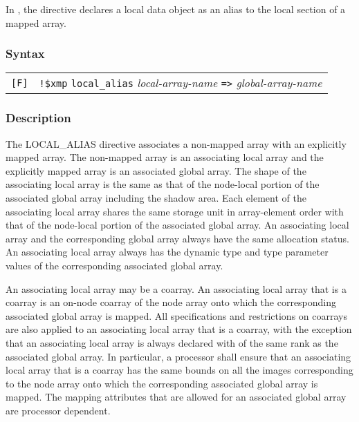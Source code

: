 In {\XMPF}, the {\tt {}} directive declares a
local data object as an alias to the local section of a mapped
array.

\subsubsection*{Syntax}

\begin{tabular}{ll}
\verb![F]! & \verb|!$xmp| {\tt local\_alias} {\it local-array-name}
\verb|=>| {\it global-array-name} \\
\end{tabular}

\subsubsection*{Description}

The LOCAL\_ALIAS directive associates a non-mapped array with
an explicitly mapped array.
The non-mapped array is an associating local array and
the explicitly mapped array is an associated global array.
The shape of the associating local array is the same as
that of the node-local portion of the associated global array
including the shadow area.
Each element of the associating local array shares the 
same storage unit in array-element order with that of the node-local portion 
of the associated global array.
An associating local array and the corresponding global array always have
the same allocation status.
An associating local array always has the dynamic type
and type parameter values of the corresponding 
associated global array.



An associating local array may be a coarray.
An associating local array that is a coarray is
an on-node coarray of the node array onto which the corresponding
associated global array is mapped.
All specifications and restrictions on coarrays are also applied to an associating local
array that is a coarray, with the exception that
an associating local array is always declared with
 of the same rank as the associated global array.
In particular, a processor shall ensure that an associating local array 
that is a coarray has
the same bounds on all the images corresponding to the node array
onto which the corresponding associated global array is mapped.
The mapping attributes that are allowed for an associated global array are
processor dependent.

